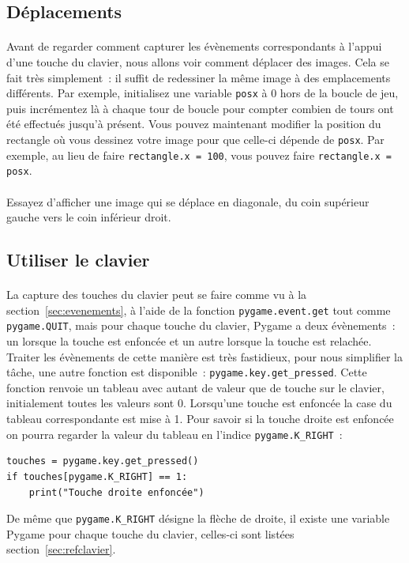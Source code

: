 \subsection{Déplacements}
\label{sec:deplacements}

\paragraph{}
Avant de regarder comment capturer les évènements correspondants à l'appui d'une touche du clavier, nous allons voir comment déplacer des images.
Cela se fait très simplement~: il suffit de redessiner la même image à des emplacements différents.
Par exemple, initialisez une variable \texttt{posx} à 0 hors de la boucle de jeu, puis incrémentez là à chaque tour de boucle pour compter combien de tours ont été effectués jusqu'à présent.
Vous pouvez maintenant modifier la position du rectangle où vous dessinez votre image pour que celle-ci dépende de \texttt{posx}.
Par exemple, au lieu de faire \texttt{rectangle.x = 100}, vous pouvez faire \texttt{rectangle.x = posx}.

\paragraph{}
Essayez d'afficher une image qui se déplace en diagonale, du coin supérieur gauche vers le coin inférieur droit.

\subsection{Utiliser le clavier}
\label{sec:clavier}

\paragraph{}
La capture des touches du clavier peut se faire comme vu à la section~\ref{sec:evenements}, à l'aide de la fonction \texttt{pygame.event.get} tout comme \texttt{pygame.QUIT}, mais pour chaque touche du clavier, Pygame a deux évènements~: un lorsque la touche est enfoncée et un autre lorsque la touche est relachée.
Traiter les évènements de cette manière est très fastidieux, pour nous simplifier la tâche, une autre fonction est disponible~: \texttt{pygame.key.get\_pressed}.
Cette fonction renvoie un tableau avec autant de valeur que de touche sur le clavier, initialement toutes les valeurs sont 0.
Lorsqu'une touche est enfoncée la case du tableau correspondante est mise à 1.
Pour savoir si la touche droite est enfoncée on pourra regarder la valeur du tableau en l'indice \texttt{pygame.K\_RIGHT}~:
\begin{verbatim}
touches = pygame.key.get_pressed()
if touches[pygame.K_RIGHT] == 1:
    print("Touche droite enfoncée")
\end{verbatim}
De même que \texttt{pygame.K\_RIGHT} désigne la flèche de droite, il existe une variable Pygame pour chaque touche du clavier, celles-ci sont listées section~\ref{sec:refclavier}.


